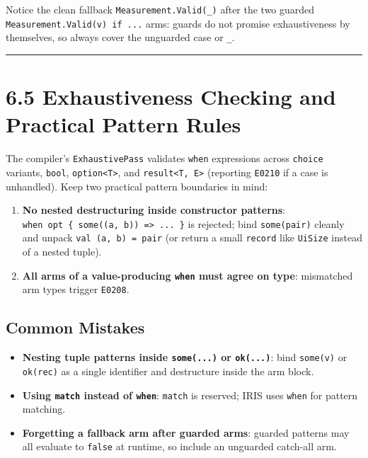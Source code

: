 \documentclass[
  english,
  oneside]{book}
\providecommand{\tightlist}{%
  \setlength{\itemsep}{0pt}\setlength{\parskip}{0pt}}
\begin{document}
Notice the clean fallback \texttt{Measurement.Valid(\_)} after the two
guarded \texttt{Measurement.Valid(v)\ if\ ...} arms: guards do not
promise exhaustiveness by themselves, so always cover the unguarded case
or \texttt{\_}.

\begin{center}\rule{0.5\linewidth}{0.5pt}\end{center}

\section{6.5 Exhaustiveness Checking and Practical Pattern
Rules}\label{exhaustiveness-checking-and-practical-pattern-rules}

The compiler's \texttt{ExhaustivePass} validates \texttt{when}
expressions across \texttt{choice} variants, \texttt{bool},
\texttt{option\textless{}T\textgreater{}}, and
\texttt{result\textless{}T,\ E\textgreater{}} (reporting \texttt{E0210}
if a case is unhandled). Keep two practical pattern boundaries in mind:

\begin{enumerate}
\def\labelenumi{\arabic{enumi}.}
\tightlist
\item
  \textbf{No nested destructuring inside constructor patterns}:
  \texttt{when\ opt\ \{\ some((a,\ b))\ =\textgreater{}\ ...\ \}} is
  rejected; bind \texttt{some(pair)} cleanly and unpack
  \texttt{val\ (a,\ b)\ =\ pair} (or return a small \texttt{record} like
  \texttt{UiSize} instead of a nested tuple).
\item
  \textbf{All arms of a value-producing \texttt{when} must agree on
  type}: mismatched arm types trigger \texttt{E0208}.
\end{enumerate}

\subsection{Common Mistakes}\label{common-mistakes-5}

\begin{itemize}
\tightlist
\item
  \textbf{Nesting tuple patterns inside \texttt{some(...)} or
  \texttt{ok(...)}}: bind \texttt{some(v)} or \texttt{ok(rec)} as a
  single identifier and destructure inside the arm block.
\item
  \textbf{Using \texttt{match} instead of \texttt{when}}: \texttt{match}
  is reserved; IRIS uses \texttt{when} for pattern matching.
\item
  \textbf{Forgetting a fallback arm after guarded arms}: guarded
  patterns may all evaluate to \texttt{false} at runtime, so include an
  unguarded catch-all arm.
\end{itemize}
\end{document}
